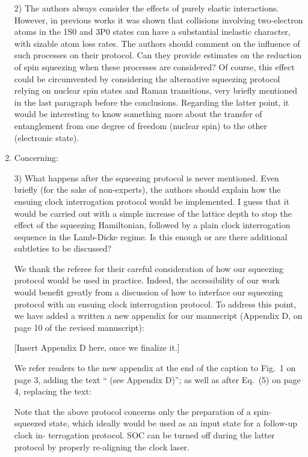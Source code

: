 \documentclass[reprint,onecolumn,12pt]{revtex4-2}
\newcommand{\blue}[1]{{\color{blue} #1}}
\newcommand{\red}[1]{{\color{red} #1}}
\newcommand{\green}[1]{{\color{ForestGreen} #1}}
\begin{document}
\begin{enumerate}
  \blue{2) The authors always consider the effects of purely elastic
    interactions. However, in previous works it was shown that
    collisions involving two-electron atoms in the 1S0 and 3P0 states
    can have a substantial inelastic character, with sizable atom loss
    rates. The authors should comment on the influence of such
    processes on their protocol. Can they provide estimates on the
    reduction of spin squeezing when these processes are considered?
    Of course, this effect could be circumvented by considering the
    alternative squeezing protocol relying on nuclear spin states and
    Raman transitions, very briefly mentioned in the last paragraph
    before the conclusions.  Regarding the latter point, it would be
    interesting to know something more about the transfer of
    entanglement from one degree of freedom (nuclear spin) to the
    other (electronic state).}



\item Concerning:

  \blue{3) What happens after the squeezing protocol is never
    mentioned. Even briefly (for the sake of non-experts), the authors
    should explain how the ensuing clock interrogation protocol would
    be implemented. I guess that it would be carried out with a simple
    increase of the lattice depth to stop the effect of the squeezing
    Hamiltonian, followed by a plain clock interrogation sequence in
    the Lamb-Dicke regime. Is this enough or are there additional
    subtleties to be discussed?}

  We thank the referee for their careful consideration of how our
  squeezing protocol would be used in practice.  Indeed, the
  accessibility of our work would benefit greatly from a discussion of
  how to interface our squeezing protocol with an ensuing clock
  interrogation protocol.  To address this point, we have added a
  written a new appendix for our manuscript (Appendix D, on page 10 of
  the revised manuscript):

  \green{[Insert Appendix D here, once we finalize it.]}

  We refer readers to the new appendix at the end of the caption to
  Fig.~1 on page 3, adding the text ``\green{(see Appendix D)}''; as
  well as after Eq.~(5) on page 4, replacing the text:

  \red{Note that the above protocol concerns only the preparation of a
    spin-squeezed state, which ideally would be used as an input state
    for a follow-up clock in- terrogation protocol. SOC can be turned
    off during the latter protocol by properly re-aligning the clock
    laser.}


\end{enumerate}
\end{document}
